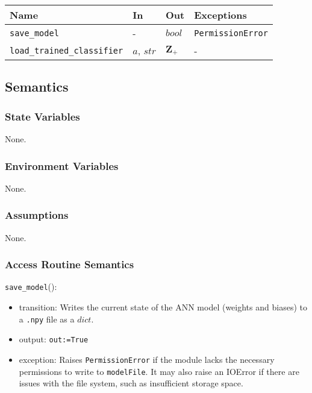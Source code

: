\documentclass[12pt, titlepage]{article}
\def\code#1{\texttt{#1}}
\begin{document}
\begin{center}
\begin{tabular}{p{5cm} p{4cm} p{4cm} p{3.5cm}}
\hline
\textbf{Name} & \textbf{In} & \textbf{Out} & \textbf{Exceptions} \\
\hline
\code{save\_model} & - & $bool$ & \code{PermissionError} \\
\code{load\_trained\_classifier} & $a$, $str$ & $\mathbf{Z}_{+}$ & - \\
\hline
\end{tabular}
\end{center}

\subsection{Semantics}

\subsubsection{State Variables}
None.

\subsubsection{Environment Variables}
None.

\subsubsection{Assumptions}
None.

\subsubsection{Access Routine Semantics}

\noindent \code{save\_model}():
\begin{itemize}
  \item transition: Writes the current state of the ANN model (weights and biases) to a \code{.npy} file 
  as a $dict$.
  \item output: \code{out:=True}
  \item exception: Raises \code{PermissionError} if the module lacks the necessary permissions to write to \code{modelFile}. 
  It may also raise an IOError if there are issues with the file system, such as insufficient storage space.
\end{itemize}
\end{document}

